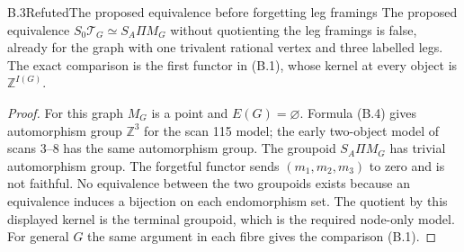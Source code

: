 \begin{result}{B.3}{Refuted}{The proposed equivalence before forgetting leg framings}
The proposed equivalence $S_0\mathcal T_G\simeq S_A\Pi M_G$ without
quotienting the leg framings is false, already for the graph with
one trivalent rational vertex and three labelled legs.  The exact
comparison is the first functor in (B.1), whose kernel at every
object is $\mathbb Z^{I(G)}$.
\end{result}
\begin{proof}
For this graph $M_G$ is a point and $E(G)=\varnothing$.  Formula
(B.4) gives automorphism group $\mathbb Z^3$ for the scan 115 model;
the early two-object model of scans 3--8 has the same automorphism
group.  The groupoid $S_A\Pi M_G$ has trivial automorphism group.
The forgetful functor sends $(m_1,m_2,m_3)$ to zero and is not
faithful.  No equivalence between the two groupoids exists because
an equivalence induces a bijection on each endomorphism set.  The
quotient by this displayed kernel is the terminal groupoid, which
is the required node-only model.  For general $G$ the same argument
in each fibre gives the comparison (B.1).
\end{proof}

